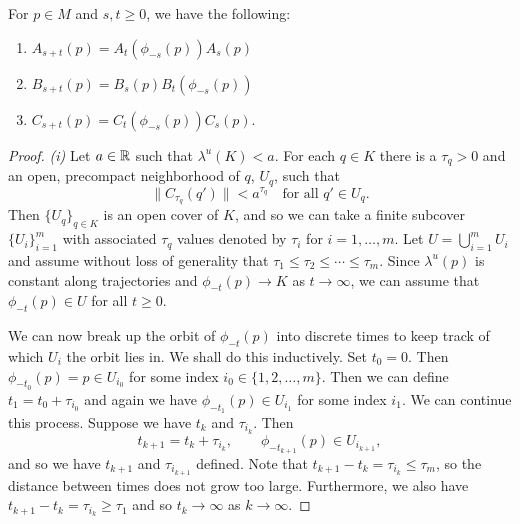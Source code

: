 \begin{lem}\label{lemma2}
	For \(p\in M\) and \(s,t\geq 0\), we have the following:
	\begin{enumerate}[label=(\roman*)]
		\item \(A_{s+t}(p) = A_t(\phi_{-s}(p)) A_s(p)\) 
		\item \(B_{s+t}(p) = B_s(p) B_t(\phi_{-s}(p))\)
		\item \(C_{s+t}(p) = C_t(\phi_{-s}(p))C_s(p)\).
	\end{enumerate}
\end{lem}
\lyapunovbound*
\begin{proof}
	\emph{(i)} Let \(a\in\mathbb{R}\) such that \(\lambda^u(K) < a\). For each \(q\in K\) there is a \(\tau_q>0\) and an open, precompact neighborhood of \(q\), \(U_q\), such that \[\| C_{\tau_q}(q')\| < a^{\tau_q} \quad \text{for all } q'\in U_q.\] Then \(\{ U_q \}_{q\in K}\) is an open cover of \(K\), and so we can take a finite subcover \(\{U_i\}_{i=1}^m\) with associated \(\tau_q\) values denoted by \(\tau_i\) for \(i = 1,\ldots, m\). Let \(U = \bigcup_{i=1}^m U_i\) and assume without loss of generality that \(\tau_1\leq \tau_2\leq\cdots\leq \tau_m\). Since \(\lambda^u(p)\) is constant along trajectories and \(\phi_{-t}(p) \to K\) as \(t\to\infty\), we can assume that \(\phi_{-t}(p) \in U\) for all \(t\geq 0.\) 
	
	We can now break up the orbit of \(\phi_{-t}(p)\) into discrete times to keep track of which \(U_i\) the orbit lies in. We shall do this inductively. Set \(t_0 = 0\). Then \(\phi_{-t_0}(p) = p \in U_{i_0}\) for some index \(i_0\in \{1,2,\ldots, m\}\). Then we can define \(t_1 = t_0 + \tau_{i_0}\) and again we have \(\phi_{-t_1}(p) \in U_{i_1}\) for some index \(i_1\). We can continue this process. Suppose we have \(t_k\) and \(\tau_{i_k}\). Then
	\begin{equation*}
		t_{k+1} = t_k + \tau_{i_k}, \qquad \phi_{-t_{k+1}}(p) \in U_{i_{k+1}},
	\end{equation*}
	and so we have \(t_{k+1}\) and \(\tau_{i_{k+1}}\) defined. Note that \(t_{k+1} - t_k = \tau_{i_k} \leq \tau_{m}\), so the distance between times does not grow too large. Furthermore, we also have \(t_{k+1} - t_k = \tau_{i_k} \geq \tau_1\) and so \(t_k \to \infty\) as \(k\to\infty.\)
	

\end{proof}
